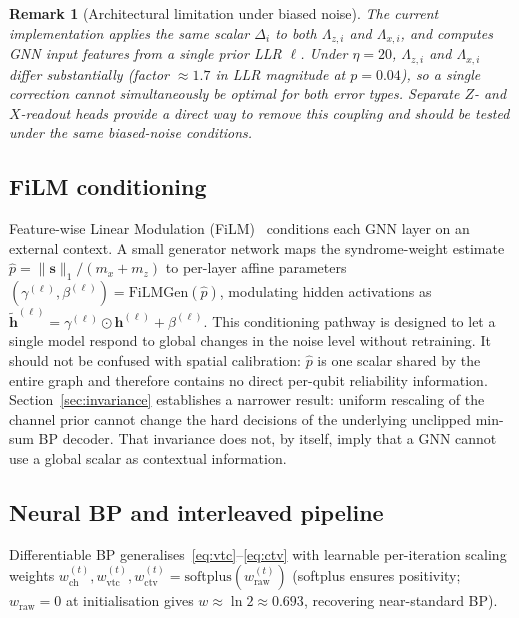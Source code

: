 \documentclass[a4paper,twocolumn,11pt,nopdfoutputerror]{quantumarticle}
\newcommand{\synd}{\mathbf{s}}
\newcommand{\llr}{\Lambda}
\newcommand{\bvec}[1]{\mathbf{#1}}
\newcommand{\phat}{\hat{p}}
\newtheorem{remark}{Remark}
\begin{document}
\begin{remark}[Architectural limitation under biased noise]
The current implementation applies the same scalar $\Delta_i$ to
both $\llr_{z,i}$ and $\llr_{x,i}$, and computes GNN input
features from a single prior LLR $\ell$. Under $\eta = 20$, $\llr_{z,i}$
and $\llr_{x,i}$ differ substantially (factor $\approx 1.7$ in
LLR magnitude at $p=0.04$), so a single correction cannot
simultaneously be optimal for both error types. Separate $Z$- and
$X$-readout heads provide a direct way to remove this coupling and should
be tested under the same biased-noise conditions.
\end{remark}

\subsection{FiLM conditioning}\label{sec:film}

Feature-wise Linear Modulation (FiLM)~\cite{Perez2018FiLM} conditions
each GNN layer on an external context. A small generator network maps
the syndrome-weight estimate
$\phat = \|\synd\|_1 / (m_x + m_z)$ to per-layer affine
parameters $(\gamma^{(\ell)}, \beta^{(\ell)}) = \mathrm{FiLMGen}(\phat)$,
modulating hidden activations as
$\tilde{\bvec{h}}^{(\ell)} = \gamma^{(\ell)} \odot \bvec{h}^{(\ell)} + \beta^{(\ell)}$.
This conditioning pathway is designed to let a single model respond to
global changes in the noise level without retraining. It should not be
confused with spatial calibration: $\phat$ is one scalar shared by the
entire graph and therefore contains no direct per-qubit reliability
information. Section~\ref{sec:invariance} establishes a narrower result:
uniform rescaling of the channel prior cannot change the hard decisions
of the underlying unclipped min-sum BP decoder. That invariance does not,
by itself, imply that a GNN cannot use a global scalar as contextual
information.

\subsection{Neural BP and interleaved pipeline}\label{sec:neuralbp}

Differentiable BP generalises~\eqref{eq:vtc}--\eqref{eq:ctv} with
learnable per-iteration scaling weights $w_\mathrm{ch}^{(t)},
w_\mathrm{vtc}^{(t)}, w_\mathrm{ctv}^{(t)} = \mathrm{softplus}(w_\mathrm{raw}^{(t)})$
(softplus ensures positivity; $w_\mathrm{raw}=0$ at initialisation
gives $w \approx \ln 2 \approx 0.693$, recovering near-standard BP).
\end{document}
